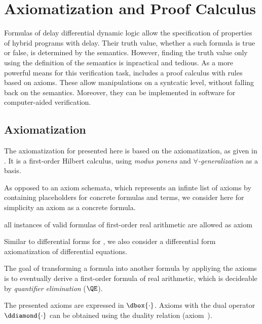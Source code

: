 \chapter{Axiomatization and Proof Calculus}
\label{ch:axiomatization-proof-calculus}

Formulas of delay differential dynamic logic allow the specification of properties of hybrid programs with delay. Their truth value, whether a such formula is true or false, is determined by the semantics. However, finding the truth value only using the definition of the semantics is inpractical and tedious. As a more powerful means for this verification task, \ddL includes a proof calculus with rules based on axioms. These allow manipulations on a syntcatic level, without falling back on the semantics.
Moreover, they can be implemented in software for computer-aided verification.

\section{Axiomatization}
    \label{sec:axiomatization}


    The axiomatization for \ddL presented here is based on the \dL axiomatization, as given in \cite{Platzer12Complete}.
    It is a first-order Hilbert calculus, using \emph{modus ponens} and \emph{$\forall$-generalization} as a basis.

    As opposed to an axiom schemata, which represents an infinte list of axioms by containing placeholders for concrete formulas and terms, we consider here for simplicity an axiom as a concrete formula.

    all instances of valid formulas of first-order real arithmetic are allowed as axiom

    Similar to differential forms for \dL \cite{Platzer15Uniform}, we also consider a differential form axiomatization of differential equations.

    The goal of transforming a \ddL formula into another formula by appliying the axioms is to eventually derive a first-order formula of real arithmetic, which is decideable by \emph{quantifier elimination} ($\QE$).

    The presented axioms are expressed in $\dbox{\cdot}$. Axioms with the dual operator $\ddiamond{\cdot}$ can be obtained using the duality relation (axiom~).

